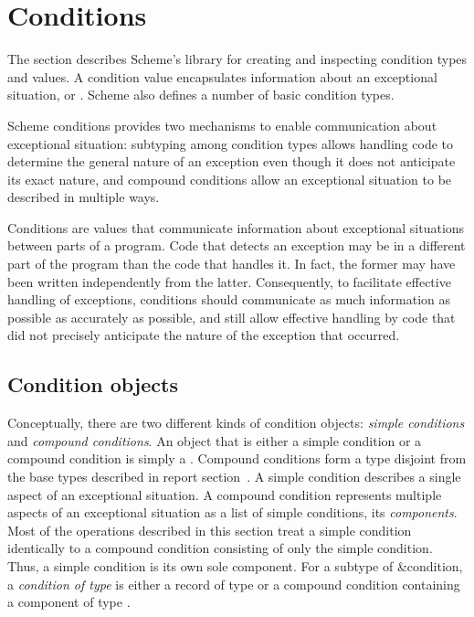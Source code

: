 \section{Conditions}
\label{conditionssection}

The section describes Scheme's  library 
for creating and inspecting
condition types and values. A condition value encapsulates information
about an exceptional situation, or
. Scheme also defines a
number of basic condition types.

Scheme conditions provides two mechanisms to enable communication
about exceptional situation: subtyping among condition types allows
handling code to determine the general nature of an exception even
though it does not anticipate its exact nature, and compound
conditions allow an exceptional situation to be described in multiple
ways.

\begin{rationale}
Conditions are values that communicate information about exceptional
situations between parts of a program. Code that detects an exception
may be in a different part of the program than the code that handles
it. In fact, the former may have been written independently from the
latter. Consequently, to facilitate effective handling of exceptions,
conditions should communicate as much information as possible as
accurately as possible, and still allow effective handling by code
that did not precisely anticipate the nature of the exception that
occurred.
\end{rationale}

\subsection{Condition objects}

Conceptually, there are two different kinds of condition objects:
\textit{simple conditions} and
\textit{compound conditions}.  An object
that is either a simple condition or a compound condition is 
simply a .  Compound conditions form a type disjoint
from the base types described in report
section~.  A simple condition
describes a single aspect of an exceptional situation.  A compound
condition represents multiple aspects of an exceptional situation as a
list of simple conditions, its \textit{components}.  Most of the
operations described in this section treat a simple condition
identically to a compound condition consisting of only the simple
condition.  Thus, a simple condition is its own sole component.  For a
subtype  of {\cf\&condition}, a \textit{condition of type
  } is either a record of type  or a compound condition
containing a component of type .

